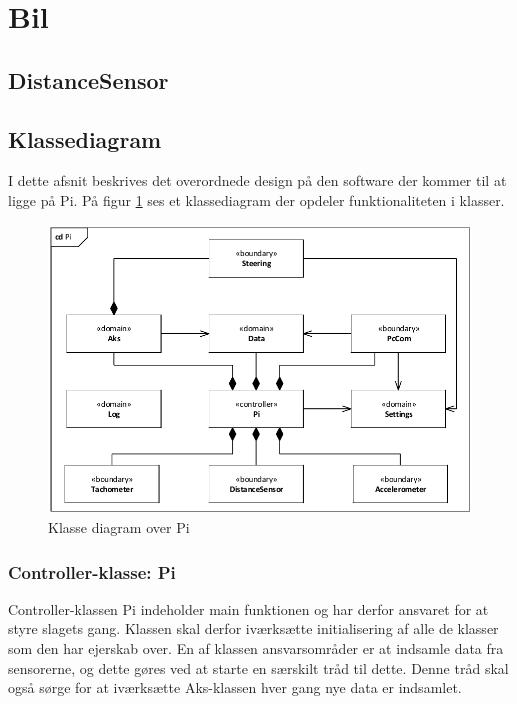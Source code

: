 \section{Bil} \label{sec:bil}

\subsection{DistanceSensor}


\subsection{Klassediagram}
I dette afsnit beskrives det overordnede design på den software der kommer til at ligge på Pi. På figur \ref{fig:cd_pi} ses et klassediagram der opdeler funktionaliteten i klasser.

\begin{figure}[h]
\centering
\includegraphics[width=\textwidth* 9/10]{../fig/diagrammer/bil/cd_pi.pdf}
\caption{Klasse diagram over Pi}
\label{fig:cd_pi}
\end{figure}

\subsubsection{Controller-klasse: Pi}
Controller-klassen Pi indeholder main funktionen og har derfor ansvaret for at styre slagets gang. Klassen skal derfor iværksætte initialisering af alle de klasser som den har ejerskab over. En af klassen ansvarsområder er at indsamle data fra sensorerne, og dette gøres ved at starte en særskilt tråd til dette. Denne tråd skal også sørge for at iværksætte Aks-klassen hver gang nye data er indsamlet.

